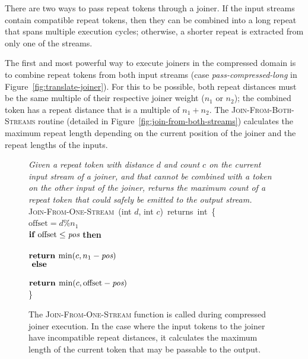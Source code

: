 There are two ways to pass repeat tokens through a joiner.  If the
input streams contain compatible repeat tokens, then they can be
combined into a long repeat that spans multiple execution cycles;
otherwise, a shorter repeat is extracted from only one of the streams.

The first and most powerful way to execute joiners in the compressed
domain is to combine repeat tokens from both input streams (case {\it
  pass-compressed-long} in Figure~\ref{fig:translate-joiner}).  For this to
be possible, both repeat distances must be the same multiple of their
respective joiner weight ($n_1$ or $n_2$); the combined token has a
repeat distance that is a multiple of $n_1 + n_2$.  The
\textsc{Join-From-Both-Streams} routine (detailed in
Figure~\ref{fig:join-from-both-streams}) calculates the maximum repeat length
depending on the current position of the joiner and the repeat lengths
of the inputs.

\begin{figure}[t!]
\centering
\begin{minipage}{0.75\textwidth}
{\it Given a repeat token with distance $d$ and count $c$ on the
  current input stream of a joiner, and that cannot be combined with a
  token on the other input of the joiner, returns the maximum count of
  a repeat token that could safely be emitted to the output stream.}\\
\textsc{Join-From-One-Stream}~(int $d$, int $c$)~returns~int~\{\\  $\mbox{offset} =
d$\%$n_1$\\ \tab$\mbox{{\bf if~}} \mbox{offset} \leq \mbox{\it pos}$ {\bf then}\\
\tab{}\\ \tab\tab$\mbox{\bf return~} \mbox{min}(c, n_1 - \mbox{\it pos})$\\ \tab$\mbox{\bf
  ~else}$\\ \tab{}\\ \tab\tab$\mbox{\bf return~} \mbox{min}(c, \mbox{offset} - \mbox{\it pos})$\\
\}
\end{minipage}
\caption[\textsc{Join-From-One-Stream} function for compressed joiner
  execution.]{The \textsc{Join-From-One-Stream} function is called during
  compressed joiner execution.  In the case where the input tokens to
  the joiner have incompatible repeat distances, it calculates the
  maximum length of the current token that may be passable to the
  output. \protect\label{fig:join-from-one-stream}}
\end{figure}

